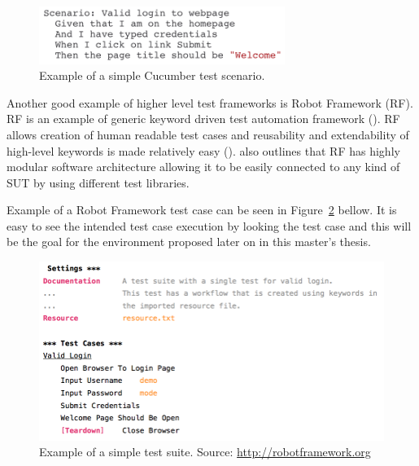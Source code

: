\begin{figure}[ht]
  \begin{center}
    \includegraphics[width=8cm]{images/cucumber_example.png}
    \caption{Example of a simple Cucumber test scenario.}
    \label{fig:cucumber}
  \end{center}
\end{figure}
\FloatBarrier

Another good example of higher level test frameworks is Robot Framework (RF). RF is an example of generic keyword driven test automation framework (\emph{\cite{robotframework}}). RF allows creation of human readable test cases and reusability and extendability of high-level keywords is made relatively easy (\emph{\cite{stresnjak2011usage}}). \emph{\cite{Rfuserguide}} also outlines that RF has highly modular software architecture allowing it to be easily connected to any kind of SUT by using different test libraries.

Example of a Robot Framework test case can be seen in Figure~\ref{fig:robot_example} bellow. It is easy to see the intended test case execution by looking the test case and this will be the goal for the environment proposed later on in this master's thesis.

\begin{figure}[ht]
  \begin{center}
    \includegraphics[width=12cm]{images/robot_example.png}
    \caption{Example of a simple test suite. Source: \url{http://robotframework.org}}
    \label{fig:robot_example}
  \end{center}
\end{figure}
\FloatBarrier
